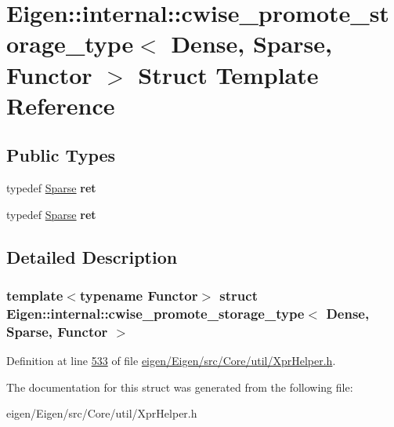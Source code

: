 \hypertarget{struct_eigen_1_1internal_1_1cwise__promote__storage__type_3_01_dense_00_01_sparse_00_01_functor_01_4}{}\section{Eigen\+:\+:internal\+:\+:cwise\+\_\+promote\+\_\+storage\+\_\+type$<$ Dense, Sparse, Functor $>$ Struct Template Reference}
\label{struct_eigen_1_1internal_1_1cwise__promote__storage__type_3_01_dense_00_01_sparse_00_01_functor_01_4}
\subsection*{Public Types}
\begin{DoxyCompactItemize}
\item 
\mbox{\label{struct_eigen_1_1internal_1_1cwise__promote__storage__type_3_01_dense_00_01_sparse_00_01_functor_01_4_a6d5d30a5bdac5999c76a2e694e4b2ad3}} 
typedef \hyperlink{struct_eigen_1_1_sparse}{Sparse} {\bfseries ret}
\item 
\mbox{\label{struct_eigen_1_1internal_1_1cwise__promote__storage__type_3_01_dense_00_01_sparse_00_01_functor_01_4_a6d5d30a5bdac5999c76a2e694e4b2ad3}} 
typedef \hyperlink{struct_eigen_1_1_sparse}{Sparse} {\bfseries ret}
\end{DoxyCompactItemize}


\subsection{Detailed Description}
\subsubsection*{template$<$typename Functor$>$\newline
struct Eigen\+::internal\+::cwise\+\_\+promote\+\_\+storage\+\_\+type$<$ Dense, Sparse, Functor $>$}



Definition at line \hyperlink{eigen_2_eigen_2src_2_core_2util_2_xpr_helper_8h_source_l00533}{533} of file \hyperlink{eigen_2_eigen_2src_2_core_2util_2_xpr_helper_8h_source}{eigen/\+Eigen/src/\+Core/util/\+Xpr\+Helper.\+h}.



The documentation for this struct was generated from the following file\+:\begin{DoxyCompactItemize}
\item 
eigen/\+Eigen/src/\+Core/util/\+Xpr\+Helper.\+h\end{DoxyCompactItemize}
